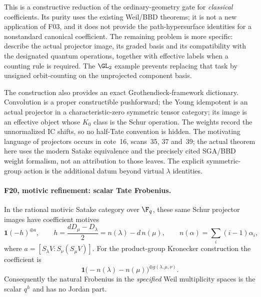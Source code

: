 \documentclass[11pt,a4paper]{article}
\newcommand{\fid}[1]{\textsf{#1}}\newcommand{\gate}[1]{\textsf{#1}}
\theoremstyle{named}\newtheorem{finding}{Finding}[section]
\theoremstyle{definition}\newtheorem{definition}[finding]{Definition}
\theoremstyle{remark}\newtheorem{remark}[finding]{Remark}
\begin{document}
This is a constructive reduction of the ordinary-geometry gate for \emph{classical} coefficients. Its purity uses the existing Weil/BBD theorems; it is not a new application of \fid{F03}, and it does not provide the path-hypersurface identities for a nonstandard canonical coefficient. The remaining problem is more specific: describe the actual projector image, its graded basis and its compatibility with the designated quantum operations, together with effective labels when a counting rule is required. The $\GL_2$ example prevents replacing that task by unsigned orbit-counting on the unprojected component basis.

The construction also provides an exact Grothendieck-framework dictionary. Convolution is a proper constructible pushforward; the Young idempotent is an actual projector in a characteristic-zero symmetric tensor category; its image is an effective object whose $K_0$ class is the Schur operation. The weights record the unnormalized IC shifts, so no half-Tate convention is hidden. The motivating language of projectors occurs in cote~16, scans~35, 37 and~39; the actual theorem here uses the modern Satake equivalence and the precisely cited SGA/BBD weight formalism, not an attribution to those leaves. The explicit symmetric-group action is the additional datum beyond virtual $\lambda$ identities.

\paragraph{\fid{F20}, motivic refinement: scalar Tate Frobenius.}
In the rational motivic Satake category over $\F_q$, these same Schur
projector images have coefficient motives
\[
 \mathbf1(-h)^{\oplus a},\qquad
 h=\frac{dD_\mu-D_\lambda}{2}
   =n(\lambda)-d\,n(\mu),\qquad
 n(\alpha)=\sum_i(i-1)\alpha_i,
\]
where $a=[S_\lambda V:S_\nu(S_\mu V)]$. For the product-group Kronecker
construction the coefficient is
\[
 \mathbf1\bigl(-n(\lambda)-n(\mu)\bigr)^{\oplus g(\lambda,\mu,\nu)}.
\]
Consequently the natural Frobenius in the \emph{specified} Weil
multiplicity spaces is the scalar $q^h$ and has no Jordan part.
\end{document}
